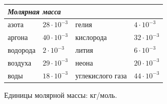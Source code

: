 \par\smallskip
\noindent{}
\par\smallskip
\noindent\begin{tabularx}{\linewidth}{|X|X|X|X|}\hline
\multicolumn{4}{|l|}{\textbf{\itshape Молярная масса}}\\\hline
азота & $28\cdot10^{-3}$ & гелия & $4\cdot10^{-3}$\\
аргона & $40\cdot10^{-3}$ & кислорода & $32\cdot10^{-3}$\\
водорода & $2\cdot10^{-3}$ & лития & $6\cdot10^{-3}$\\
воздуха & $29\cdot10^{-3}$ & неона & $20\cdot10^{-3}$\\
воды & $18\cdot10^{-3}$ & углекислого газа & $44\cdot10^{-3}$\\\hline
\end{tabularx}
\noindent\small\hfill Единицы молярной массы: кг/моль.\normalsize
